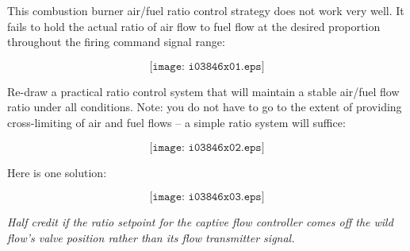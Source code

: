 

This combustion burner air/fuel ratio control strategy does not work very well.  It fails to hold the actual ratio of air flow to fuel flow at the desired proportion throughout the firing command signal range:

$$\texttt{[image: i03846x01.eps]}$$

Re-draw a practical ratio control system that will maintain a stable air/fuel flow ratio under all conditions.  Note: you do not have to go to the extent of providing cross-limiting of air and fuel flows -- a simple ratio system will suffice:

$$\texttt{[image: i03846x02.eps]}$$







Here is one solution:

$$\texttt{[image: i03846x03.eps]}$$

{\it Half credit if the ratio setpoint for the captive flow controller comes off the wild flow's valve position rather than its flow transmitter signal.}










